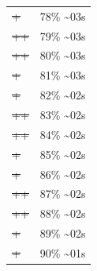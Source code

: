 \documentclass[12pt]{article}
\begin{document}
\begin{center}
\begin{tabular}{ll}
\sout{\sout{\sout{\sout{\sout{\sout{\sout{\sout{\sout{\sout{\sout{\sout{\sout{\sout{\sout{\sout{\sout{\sout{\sout{+}}}}}}}}}}}}}}}}}}} & 78\% \textasciitilde{}03s\\
\sout{\sout{\sout{\sout{\sout{\sout{\sout{\sout{\sout{\sout{\sout{\sout{\sout{\sout{\sout{\sout{\sout{\sout{\sout{++}}}}}}}}}}}}}}}}}}} & 79\% \textasciitilde{}03s\\
\sout{\sout{\sout{\sout{\sout{\sout{\sout{\sout{\sout{\sout{\sout{\sout{\sout{\sout{\sout{\sout{\sout{\sout{\sout{++}}}}}}}}}}}}}}}}}}} & 80\% \textasciitilde{}03s\\
\sout{\sout{\sout{\sout{\sout{\sout{\sout{\sout{\sout{\sout{\sout{\sout{\sout{\sout{\sout{\sout{\sout{\sout{\sout{\sout{+}}}}}}}}}}}}}}}}}}}} & 81\% \textasciitilde{}03s\\
\sout{\sout{\sout{\sout{\sout{\sout{\sout{\sout{\sout{\sout{\sout{\sout{\sout{\sout{\sout{\sout{\sout{\sout{\sout{\sout{+}}}}}}}}}}}}}}}}}}}} & 82\% \textasciitilde{}02s\\
\sout{\sout{\sout{\sout{\sout{\sout{\sout{\sout{\sout{\sout{\sout{\sout{\sout{\sout{\sout{\sout{\sout{\sout{\sout{\sout{++}}}}}}}}}}}}}}}}}}}} & 83\% \textasciitilde{}02s\\
\sout{\sout{\sout{\sout{\sout{\sout{\sout{\sout{\sout{\sout{\sout{\sout{\sout{\sout{\sout{\sout{\sout{\sout{\sout{\sout{++}}}}}}}}}}}}}}}}}}}} & 84\% \textasciitilde{}02s\\
\sout{\sout{\sout{\sout{\sout{\sout{\sout{\sout{\sout{\sout{\sout{\sout{\sout{\sout{\sout{\sout{\sout{\sout{\sout{\sout{\sout{+}}}}}}}}}}}}}}}}}}}}} & 85\% \textasciitilde{}02s\\
\sout{\sout{\sout{\sout{\sout{\sout{\sout{\sout{\sout{\sout{\sout{\sout{\sout{\sout{\sout{\sout{\sout{\sout{\sout{\sout{\sout{+}}}}}}}}}}}}}}}}}}}}} & 86\% \textasciitilde{}02s\\
\sout{\sout{\sout{\sout{\sout{\sout{\sout{\sout{\sout{\sout{\sout{\sout{\sout{\sout{\sout{\sout{\sout{\sout{\sout{\sout{\sout{++}}}}}}}}}}}}}}}}}}}}} & 87\% \textasciitilde{}02s\\
\sout{\sout{\sout{\sout{\sout{\sout{\sout{\sout{\sout{\sout{\sout{\sout{\sout{\sout{\sout{\sout{\sout{\sout{\sout{\sout{\sout{++}}}}}}}}}}}}}}}}}}}}} & 88\% \textasciitilde{}02s\\
\sout{\sout{\sout{\sout{\sout{\sout{\sout{\sout{\sout{\sout{\sout{\sout{\sout{\sout{\sout{\sout{\sout{\sout{\sout{\sout{\sout{\sout{+}}}}}}}}}}}}}}}}}}}}}} & 89\% \textasciitilde{}02s\\
\sout{\sout{\sout{\sout{\sout{\sout{\sout{\sout{\sout{\sout{\sout{\sout{\sout{\sout{\sout{\sout{\sout{\sout{\sout{\sout{\sout{\sout{+}}}}}}}}}}}}}}}}}}}}}} & 90\% \textasciitilde{}01s\\

\end{tabular}
\end{center}
\end{document}
